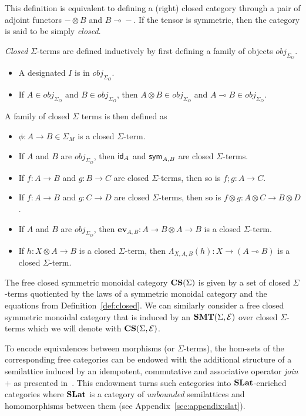 This definition is equivalent to defining a (right) closed category through a pair of adjoint functors $- \otimes B$ and $B \multimap{} -$.
If the tensor is symmetric, then the category is said to be simply \textit{closed}.

\begin{definition}
\textit{Closed} $\Sigma$-terms are defined inductively by first defining a family of objects $obj_{\Sigma_{O}}$.
\begin{itemize}
\item A designated $I$ is in $obj_{\Sigma_{O}}$.
\item If $A \in obj_{\Sigma_{O}}$ and $B \in obj_{\Sigma_{O}}$, then $A \otimes B \in obj_{\Sigma_{O}}$ and $A \multimap B \in obj_{\Sigma_{O}}$.
\end{itemize}
A family of closed $\Sigma$ terms is then defined as
\begin{itemize}
    \item $\phi : A \to B \in \Sigma_{M}$ is a closed $\Sigma$-term.
    \item If $A$ and $B$ are $obj_{\Sigma_{O}}$, then $\textsf{id}_{A}$ and $\textsf{sym}_{A,B}$ are closed $\Sigma$-terms.
    \item If $f : A \to B$ and $g : B \to C$ are closed $\Sigma$-terms, then so is $f;g : A \to C$. 
    \item If $f : A \to B$ and $g : C \to D$ are closed $\Sigma$-terms, then so is $f \otimes g : A \otimes C \to B \otimes D$.
    \item If $A$ and $B$ are $obj_{\Sigma_{O}}$, then $\textbf{ev}_{A,B} : A \multimap B \otimes A \to B$ is a closed $\Sigma$-term.
    \item If $h : X \otimes A \to B$ is a closed $\Sigma$-term, then $\Lambda_{X,A,B}(h) : X \to (A \multimap B)$ is a closed $\Sigma$-term.
\end{itemize}
\end{definition}

\begin{definition}
The free closed symmetric monoidal category $\mathbf{CS}(\Sigma)$ is given by a set of closed $\Sigma$-terms quotiented by the laws of a symmetric monoidal category and the equations from Definition~\ref{def:closed}.
We can similarly consider a free closed symmetric monoidal category that is induced by an $\mathbf{SMT}(\Sigma, \mathcal{E})$ over closed $\Sigma$-terms which we will denote with $\mathbf{CS}(\Sigma, \mathcal{E})$.
\end{definition}

To encode equivalences between morphisms (or $\Sigma$-terms), the hom-sets of the corresponding free categories can be endowed with the additional structure of a semilattice induced by an idempotent, commutative and associative operator \textit{join} $+$ as presented in~\cite{ghica2024equivalencehypergraphsegraphsmonoidal}.
This endowment turns such categories into $\mathbf{SLat}$-enriched categories where $\mathbf{SLat}$ is a category of \textit{unbounded} semilattices and homomorphisms between them (see Appendix~\ref{sec:appendix:slat}).

